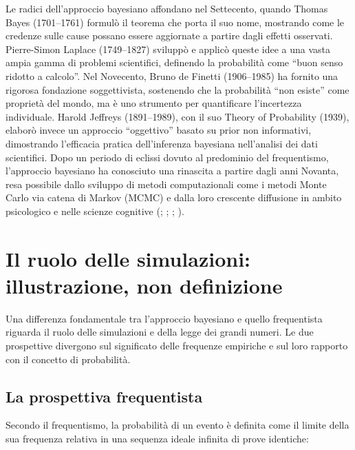\documentclass[
  italian,
  letterpaper,
  a4paper,
  11pt,
  open=any]{scrbook}
\theoremstyle{plain}
\theoremstyle{definition}
\theoremstyle{definition}
\theoremstyle{remark}
\begin{document}
Le radici dell'approccio bayesiano affondano nel Settecento, quando
Thomas Bayes (1701--1761) formulò il teorema che porta il suo nome,
mostrando come le credenze sulle cause possano essere aggiornate a
partire dagli effetti osservati. Pierre-Simon Laplace (1749--1827)
sviluppò e applicò queste idee a una vasta ampia gamma di problemi
scientifici, definendo la probabilità come ``buon senso ridotto a
calcolo''. Nel Novecento, Bruno de Finetti (1906--1985) ha fornito una
rigorosa fondazione soggettivista, sostenendo che la probabilità ``non
esiste'' come proprietà del mondo, ma è uno strumento per quantificare
l'incertezza individuale. Harold Jeffreys (1891--1989), con il suo
Theory of Probability (1939), elaborò invece un approccio ``oggettivo''
basato su prior non informativi, dimostrando l'efficacia pratica
dell'inferenza bayesiana nell'analisi dei dati scientifici. Dopo un
periodo di eclissi dovuto al predominio del frequentismo, l'approccio
bayesiano ha conosciuto una rinascita a partire dagli anni Novanta, resa
possibile dallo sviluppo di metodi computazionali come i metodi Monte
Carlo via catena di Markov (MCMC) e dalla loro crescente diffusione in
ambito psicologico e nelle scienze cognitive
(;
;
;
).

\section{Il ruolo delle simulazioni: illustrazione, non
definizione}\label{il-ruolo-delle-simulazioni-illustrazione-non-definizione}

Una differenza fondamentale tra l'approccio bayesiano e quello
frequentista riguarda il ruolo delle simulazioni e della legge dei
grandi numeri. Le due prospettive divergono sul significato delle
frequenze empiriche e sul loro rapporto con il concetto di probabilità.

\subsection{La prospettiva
frequentista}\label{la-prospettiva-frequentista}

Secondo il frequentismo, la probabilità di un evento è definita come il
limite della sua frequenza relativa in una sequenza ideale infinita di
prove identiche:
\end{document}
